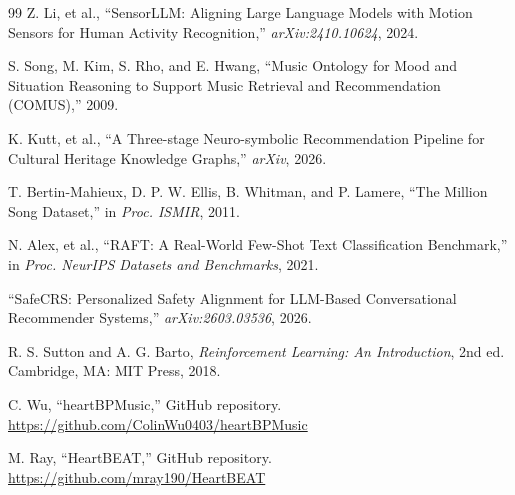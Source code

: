 \documentclass[11pt,a4paper]{article}
\begin{document}
\begin{thebibliography}{99}
		Z. Li, et al.,
		``SensorLLM: Aligning Large Language Models with Motion Sensors for Human Activity Recognition,''
		\textit{arXiv:2410.10624}, 2024.

		S. Song, M. Kim, S. Rho, and E. Hwang,
		``Music Ontology for Mood and Situation Reasoning to Support Music Retrieval and Recommendation (COMUS),''
		2009.

		K. Kutt, et al.,
		``A Three-stage Neuro-symbolic Recommendation Pipeline for Cultural Heritage Knowledge Graphs,''
		\textit{arXiv}, 2026.

		T. Bertin-Mahieux, D. P. W. Ellis, B. Whitman, and P. Lamere,
		``The Million Song Dataset,''
		in \textit{Proc. ISMIR}, 2011.

		N. Alex, et al.,
		``RAFT: A Real-World Few-Shot Text Classification Benchmark,''
		in \textit{Proc. NeurIPS Datasets and Benchmarks}, 2021.

		``SafeCRS: Personalized Safety Alignment for LLM-Based Conversational Recommender Systems,''
		\textit{arXiv:2603.03536}, 2026.

		R. S. Sutton and A. G. Barto,
		\textit{Reinforcement Learning: An Introduction}, 2nd ed.
		Cambridge, MA: MIT Press, 2018.

		C. Wu,
		``heartBPMusic,''
		GitHub repository. \url{https://github.com/ColinWu0403/heartBPMusic}

		M. Ray,
		``HeartBEAT,''
		GitHub repository. \url{https://github.com/mray190/HeartBEAT}

	\end{thebibliography}
\end{document}
